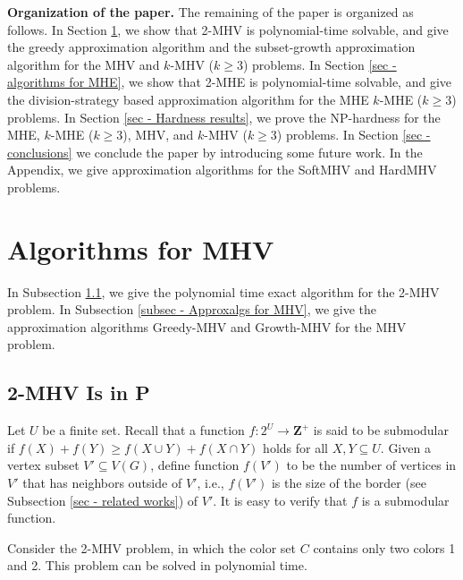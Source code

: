 \documentclass[11pt]{article}
\begin{document}
\bigskip
{\bf Organization of the paper.}
The remaining of the paper is organized as follows.
In Section \ref{sec - algorithms for MHV}, we show that 2-MHV is
polynomial-time solvable, and give the greedy approximation algorithm
and the subset-growth approximation algorithm for the MHV and $k$-MHV
($k \geq 3$) problems.
In Section \ref{sec - algorithms for MHE}, we show that 2-MHE is
polynomial-time solvable, and give the division-strategy based approximation
algorithm for the MHE $k$-MHE ($k \geq 3$) problems.
In Section \ref{sec - Hardness results}, we prove the NP-hardness for the MHE,
$k$-MHE ($k \geq 3$), MHV, and $k$-MHV ($k \geq 3$) problems.
In Section \ref{sec - conclusions} we conclude the paper by
introducing some future work. In the Appendix, we give approximation
algorithms for the SoftMHV and HardMHV problems.




\section{Algorithms for MHV}
\label{sec - algorithms for MHV}
In Subsection \ref{subsec - 2-MHV Is in P}, we give the polynomial time exact
algorithm for the 2-MHV problem. In Subsection \ref{subsec - Approxalgs for MHV},
we give the approximation algorithms {\sc Greedy-MHV} and {\sc Growth-MHV} for
the MHV problem.




\subsection{2-MHV Is in P}
\label{subsec - 2-MHV Is in P}
Let $U$ be a finite set. Recall that a function
$f \colon 2^U \rightarrow \mathbf{Z}^+$ is said to be submodular if
$f(X) + f(Y) \geq f(X \cup Y) + f(X \cap Y)$ holds for all $X, Y \subseteq U$.
Given a vertex subset $V' \subseteq V(G)$, define function $f(V')$ to be
the number of vertices in $V'$ that has neighbors outside of $V'$, i.e.,
$f(V')$ is the size of the border (see Subsection \ref{sec - related works})
of $V'$. It is easy to verify that $f$ is a submodular function.

Consider the 2-MHV problem, in which the color set $C$ contains only two
colors 1 and 2. This problem can be solved in polynomial
time.
\end{document}
